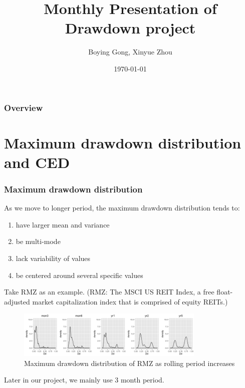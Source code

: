 \documentclass{beamer}
\title[Drawdown project]{Monthly Presentation of Drawdown project} %
\author{Boying Gong, Xinyue Zhou} %
\institute[UC Berkeley] %
{
University of California, Berkeley \\ %
\medskip
\textit{jorothy\_gong@berkeley.edu \\}
\textit{xinyue233@berkeley.edu} %
}
\date{\today} %
\newcommand\Fontvii{\fontsize{7}{8.2}\selectfont}
\newcommand\Fontviii{\fontsize{8}{9.2}\selectfont}
\begin{document}
\begin{frame}
\titlepage %
\end{frame}

\begin{frame}
\frametitle{Overview} %
\tableofcontents %
\end{frame}


\section{Maximum drawdown distribution and CED}

\begin{frame}
\frametitle{Maximum drawdown distribution}
\Fontviii

As we move to longer period, the maximum drawdown distribution tends to:
\begin{enumerate}
\item have larger mean and variance
\item be multi-mode 
\item lack variability of values
\item be centered around several specific values
\end{enumerate}

Take RMZ as an example. (RMZ: The MSCI US REIT Index, a free float-adjusted market capitalization index that is comprised of equity REITs.)

\begin{figure}[h]
\Fontvii
\centering 
\includegraphics[width = 0.8\textwidth]{../results/maxdd_RMZ}
\caption{Maximum drawdown distribution of RMZ as rolling period increases} 
\label{fig: dmaxdd_RMZ}
\end{figure}

Later in our project, we mainly use 3 month period.

\end{frame}
\end{document}
